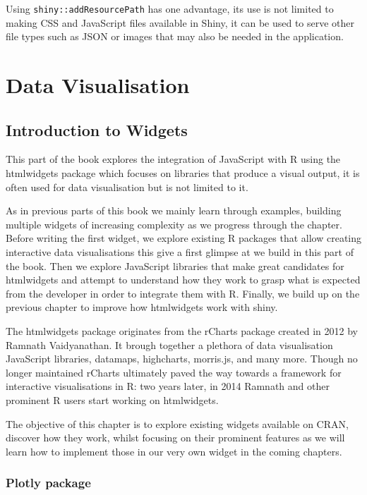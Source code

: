 \documentclass[
]{krantz}
\begin{document}
Using \texttt{shiny::addResourcePath} has one advantage, its use is not limited to making CSS and JavaScript files available in Shiny, it can be used to serve other file types such as JSON or images that may also be needed in the application.

\hypertarget{part-data-visualisation}{%
\part{Data Visualisation}\label{part-data-visualisation}}

\hypertarget{widgets-intro-intro}{%
\chapter{Introduction to Widgets}\label{widgets-intro-intro}}

This part of the book explores the integration of JavaScript with R using the htmlwidgets package which focuses on libraries that produce a visual output, it is often used for data visualisation but is not limited to it.

As in previous parts of this book we mainly learn through examples, building multiple widgets of increasing complexity as we progress through the chapter. Before writing the first widget, we explore existing R packages that allow creating interactive data visualisations this give a first glimpse at we build in this part of the book. Then we explore JavaScript libraries that make great candidates for htmlwidgets and attempt to understand how they work to grasp what is expected from the developer in order to integrate them with R. Finally, we build up on the previous chapter to improve how htmlwidgets work with shiny.

The htmlwidgets package originates from the rCharts \citep{R-rCharts} package created in 2012 by Ramnath Vaidyanathan. It brough together a plethora of data visualisation JavaScript libraries, datamaps, highcharts, morris.js, and many more. Though no longer maintained rCharts ultimately paved the way towards a framework for interactive visualisations in R: two years later, in 2014 Ramnath and other prominent R users start working on htmlwidgets.

The objective of this chapter is to explore existing widgets available on CRAN, discover how they work, whilst focusing on their prominent features as we will learn how to implement those in our very own widget in the coming chapters.

\hypertarget{widgets-plotly}{%
\section{Plotly package}\label{widgets-plotly}}
\end{document}

